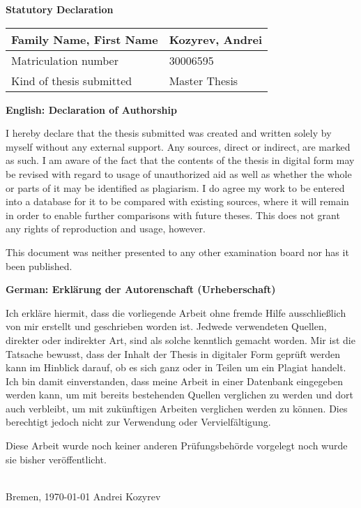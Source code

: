 \begin{center}
    \Large \textbf{Statutory Declaration}
\end{center}

\vspace*{3mm}

\begin{center}
\begin{tabular}{ p{} p{} }
    \toprule
    Family Name, First Name & Kozyrev, Andrei \\
    \midrule
    Matriculation number & 30006595 \\
    \midrule
    Kind of thesis submitted & Master Thesis \\
    \bottomrule
\end{tabular}
\end{center}

\vspace*{3mm}

\begin{small}

{\noindent \normalsize \textbf{English: Declaration of Authorship}}

I hereby declare that the thesis submitted was created and written
solely by myself without any external support. Any sources, direct
or indirect, are marked as such. I am aware of the fact that the
contents of the thesis in digital form may be revised with regard to
usage of unauthorized aid as well as whether the whole or parts of
it may be identified as plagiarism. I do agree my work to be entered
into a database for it to be compared with existing sources, where
it will remain in order to enable further comparisons with future
theses. This does not grant any rights of reproduction and usage,
however.

This document was neither presented to any other examination board
nor has it been published.

\vspace*{3em}

{\noindent \normalsize \textbf{German: Erklärung der Autorenschaft (Urheberschaft)}}

Ich erkläre hiermit, dass die vorliegende Arbeit ohne fremde Hilfe
ausschließlich von mir erstellt und geschrieben worden ist. Jedwede
verwendeten Quellen, direkter oder indirekter Art, sind als solche
kenntlich gemacht worden. Mir ist die Tatsache bewusst, dass der
Inhalt der Thesis in digitaler Form geprüft werden kann im Hinblick
darauf, ob es sich ganz oder in Teilen um ein Plagiat handelt. Ich
bin damit einverstanden, dass meine Arbeit in einer Datenbank
eingegeben werden kann, um mit bereits bestehenden Quellen
verglichen zu werden und dort auch verbleibt, um mit zukünftigen
Arbeiten verglichen werden zu können. Dies berechtigt jedoch nicht
zur Verwendung oder Vervielfältigung.

Diese Arbeit wurde noch keiner anderen Prüfungsbehörde vorgelegt
noch wurde sie bisher veröffentlicht.

\end{small}

\vspace{2em}

\noindent \dotfill \\
Bremen, \today{} \hfill Andrei Kozyrev